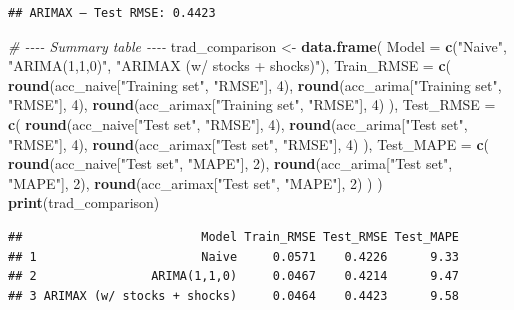 \documentclass[
]{article}
\newenvironment{Shaded}{\begin{snugshade}}{\end{snugshade}}
\newcommand{\AttributeTok}[1]{\textcolor[rgb]{0.13,0.29,0.53}{#1}}
\newcommand{\CommentTok}[1]{\textcolor[rgb]{0.56,0.35,0.01}{\textit{#1}}}
\newcommand{\DecValTok}[1]{\textcolor[rgb]{0.00,0.00,0.81}{#1}}
\newcommand{\FunctionTok}[1]{\textcolor[rgb]{0.13,0.29,0.53}{\textbf{#1}}}
\newcommand{\NormalTok}[1]{#1}
\newcommand{\OtherTok}[1]{\textcolor[rgb]{0.56,0.35,0.01}{#1}}
\newcommand{\StringTok}[1]{\textcolor[rgb]{0.31,0.60,0.02}{#1}}
\begin{document}
\begin{verbatim}
## ARIMAX — Test RMSE: 0.4423
\end{verbatim}

\begin{Shaded}
\begin{Highlighting}[]
\CommentTok{\# {-}{-}{-}{-} Summary table {-}{-}{-}{-}}
\NormalTok{trad\_comparison }\OtherTok{\textless{}{-}} \FunctionTok{data.frame}\NormalTok{(}
  \AttributeTok{Model  =} \FunctionTok{c}\NormalTok{(}\StringTok{"Naive"}\NormalTok{, }\StringTok{"ARIMA(1,1,0)"}\NormalTok{, }\StringTok{"ARIMAX (w/ stocks + shocks)"}\NormalTok{),}
  \AttributeTok{Train\_RMSE =} \FunctionTok{c}\NormalTok{(}
    \FunctionTok{round}\NormalTok{(acc\_naive[}\StringTok{"Training set"}\NormalTok{, }\StringTok{"RMSE"}\NormalTok{], }\DecValTok{4}\NormalTok{),}
    \FunctionTok{round}\NormalTok{(acc\_arima[}\StringTok{"Training set"}\NormalTok{, }\StringTok{"RMSE"}\NormalTok{], }\DecValTok{4}\NormalTok{),}
    \FunctionTok{round}\NormalTok{(acc\_arimax[}\StringTok{"Training set"}\NormalTok{, }\StringTok{"RMSE"}\NormalTok{], }\DecValTok{4}\NormalTok{)}
\NormalTok{  ),}
  \AttributeTok{Test\_RMSE =} \FunctionTok{c}\NormalTok{(}
    \FunctionTok{round}\NormalTok{(acc\_naive[}\StringTok{"Test set"}\NormalTok{, }\StringTok{"RMSE"}\NormalTok{], }\DecValTok{4}\NormalTok{),}
    \FunctionTok{round}\NormalTok{(acc\_arima[}\StringTok{"Test set"}\NormalTok{, }\StringTok{"RMSE"}\NormalTok{], }\DecValTok{4}\NormalTok{),}
    \FunctionTok{round}\NormalTok{(acc\_arimax[}\StringTok{"Test set"}\NormalTok{, }\StringTok{"RMSE"}\NormalTok{], }\DecValTok{4}\NormalTok{)}
\NormalTok{  ),}
  \AttributeTok{Test\_MAPE =} \FunctionTok{c}\NormalTok{(}
    \FunctionTok{round}\NormalTok{(acc\_naive[}\StringTok{"Test set"}\NormalTok{, }\StringTok{"MAPE"}\NormalTok{], }\DecValTok{2}\NormalTok{),}
    \FunctionTok{round}\NormalTok{(acc\_arima[}\StringTok{"Test set"}\NormalTok{, }\StringTok{"MAPE"}\NormalTok{], }\DecValTok{2}\NormalTok{),}
    \FunctionTok{round}\NormalTok{(acc\_arimax[}\StringTok{"Test set"}\NormalTok{, }\StringTok{"MAPE"}\NormalTok{], }\DecValTok{2}\NormalTok{)}
\NormalTok{  )}
\NormalTok{)}
\FunctionTok{print}\NormalTok{(trad\_comparison)}
\end{Highlighting}
\end{Shaded}

\begin{verbatim}
##                         Model Train_RMSE Test_RMSE Test_MAPE
## 1                       Naive     0.0571    0.4226      9.33
## 2                ARIMA(1,1,0)     0.0467    0.4214      9.47
## 3 ARIMAX (w/ stocks + shocks)     0.0464    0.4423      9.58
\end{verbatim}
\end{document}
